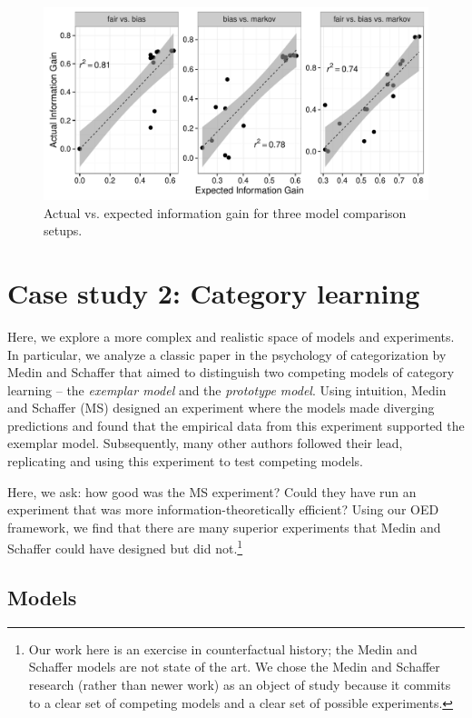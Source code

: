 \documentclass{article}
\begin{document}
\begin{figure}[t]
\centering
\includegraphics[width=0.7\columnwidth]{img/coin_eig_aig_scatter_noText.pdf}
\caption{Actual vs. expected information gain for three model comparison setups.}
\label{fig:aig_vs_eig}
\end{figure}

\section{Case study 2: Category learning}

Here, we explore a more complex and realistic space of models and experiments.
In particular, we analyze a classic paper in the psychology of categorization by Medin and Schaffer \cite{medin78:pr} that aimed to distinguish two competing models of category learning -- the \emph{exemplar model} and the \emph{prototype model}.
Using intuition, Medin and Schaffer (MS) designed an experiment where the models made diverging predictions and found that the empirical data from this experiment supported the exemplar model.
Subsequently, many other authors followed their lead, replicating and using this experiment to test competing models.

Here, we ask: how good was the MS experiment?
Could they have run an experiment that was more information-theoretically efficient?
Using our OED framework, we find that there are many superior experiments that Medin and Schaffer could have designed but did not.\footnote{Our work here is an exercise in counterfactual history; the Medin and Schaffer models are not state of the art. We chose the Medin and Schaffer research (rather than newer work) as an object of study because it commits to a clear set of competing models and a clear set of possible experiments.}



\subsection{Models}
\end{document}
